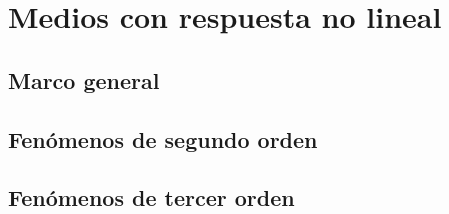 \newpage
\section{Medios con respuesta no lineal}
\label{sec.3-mediosnolineales}

\subsection{Marco general}
\label{subsec.3-general}


\subsection{Fenómenos de segundo orden}
\label{subsec.3-segundoorden}



\subsection{Fenómenos de tercer orden}
\label{subsec.3-tercerorden}


